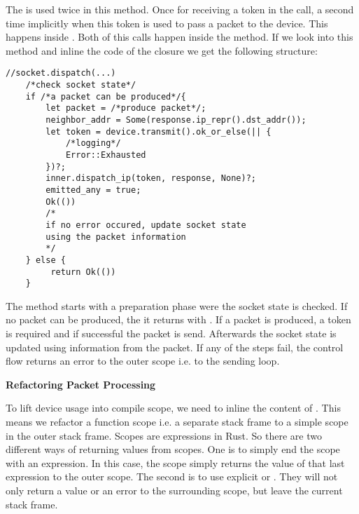  The \dev{} is used twice in this method. Once for receiving a token in the  call, a second time implicitly when this token is used to pass a packet to the device. This happens inside . Both of this calls happen inside the  method. If we look into this method and inline the code of the  closure we get the following structure: 
 
\begin{verbatim}
//socket.dispatch(...)
    /*check socket state*/
    if /*a packet can be produced*/{
        let packet = /*produce packet*/;
        neighbor_addr = Some(response.ip_repr().dst_addr());
        let token = device.transmit().ok_or_else(|| {
            /*logging*/
            Error::Exhausted
        })?;
        inner.dispatch_ip(token, response, None)?;
        emitted_any = true;
        Ok(())
        /* 
        if no error occured, update socket state
        using the packet information        
        */
    } else {
         return Ok(())
    }                    
\end{verbatim}

The method starts with a preparation phase were the socket state is checked. If no packet can be produced, the it returns with . If a packet is produced, a token is required and if successful the packet is send. Afterwards the socket state is updated using information from the packet. If any of the steps fail, the control flow returns an error to the outer scope i.e. to the sending loop. 

\textbf{Refactoring Packet Processing}

To lift device usage into compile scope, we need to inline the content of . This means we refactor a function scope i.e. a separate stack frame to a simple scope in the outer stack frame. Scopes are expressions in Rust. So there are two different ways of returning values from scopes. One is to simply end the scope with an expression. In this case, the scope simply returns the value of that last expression to the outer scope. The second is to use explicit  or . They will not only return a value or an error to the surrounding scope, but leave the current stack frame. \\

